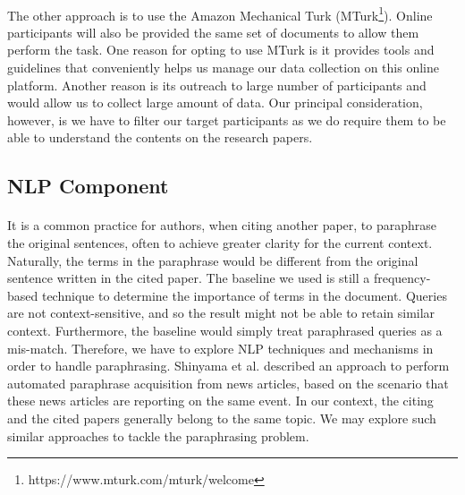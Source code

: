 \documentclass[12 pt]{article}
\begin{document}
\paragraph{}
The other approach is to use the Amazon Mechanical Turk (MTurk\footnote{https://www.mturk.com/mturk/welcome}). Online participants will also be provided the same set of documents to allow them perform the task. One reason for opting to use MTurk is it provides tools and guidelines that conveniently helps us manage our data collection on this online platform. Another reason is its outreach to large number of participants and would allow us to collect large amount of data. Our principal consideration, however, is we have to filter our target participants as we do require them to be able to understand the contents on the research papers.

\subsection{NLP Component}
\paragraph{}
It is a common practice for authors, when citing another paper, to paraphrase the original sentences, often to achieve greater clarity for the current context. Naturally, the terms in the paraphrase would be different from the original sentence written in the cited paper. The baseline we used is still a frequency-based technique to determine the importance of terms in the document. Queries are not context-sensitive, and so the result might not be able to retain similar context. Furthermore, the baseline would simply treat paraphrased queries as a mis-match. Therefore, we have to explore NLP techniques and mechanisms in order to handle paraphrasing. Shinyama et al.\cite{paraphrase2} described an approach to perform automated paraphrase acquisition from news articles, based on the scenario that these news articles are reporting on the same event. In our context, the citing and the cited papers generally belong to the same topic. We may explore such similar approaches to tackle the paraphrasing problem.

\singlespacing

\end{document}
